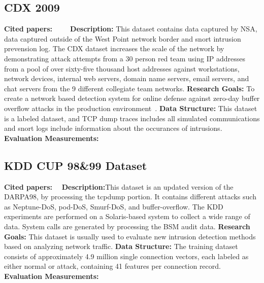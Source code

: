 \subsection{CDX 2009}
\textbf{Cited papers:} ~\cite{homoliak2013asnm} ~\cite{sangster2009toward}~\cite{chen2014human}\newline
\textbf{Description:} This dataset contains data captured by NSA, data captured outside of the West Point network border and snort intrusion prevension log. The CDX dataset increases the scale of the network by demonstrating attack attempts from a 30 person red team using IP addresses from a pool of over sixty-five thousand host addresses against workstations, network devices, internal web servers, domain name servers, email servers, and chat servers from the 9 different collegiate team networks.\newline
\textbf{Research Goals:} To create a network based detection system for online defense against zero-day buffer overflow attacks in the production environment~\cite{homoliak2013asnm}. \newline
\textbf{Data Structure:} This dataset is a labeled dataset, and TCP dump traces includes all simulated communications and snort logs include information about the occurances of intrusions. \newline
\textbf{Evaluation Measurements:} \newline


\subsection{KDD CUP 98\&99 Dataset}
\textbf{Cited papers:}~\cite{barddal2015sncstream}~\cite{tavallaee2009detailed}\newline
\textbf{Description:}This dataset is an updated version of the DARPA98,
by processing the tcpdump portion. It contains different attacks such as Neptune-DoS, pod-DoS, Smurf-DoS, and buffer-overflow. The KDD experiments are performed on a Solaris-based system to collect a wide range of data. System calls are generated by processing the BSM audit data. 
\textbf{Research Goals:} This dataset is usually used to evaluate new intrusion detection methods based on analyzing network traffic. \newline
\textbf{Data Structure:} The training dataset consists of approximately 4.9 million single connection vectors, each labeled as either normal or attack, containing 41 features per connection record. \newline
\textbf{Evaluation Measurements:} \newline





